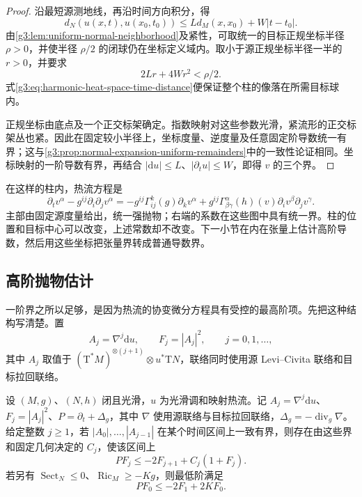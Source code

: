\begin{proof}
	沿最短源测地线，再沿时间方向积分，得
	\begin{equation}\label{g3:eq:harmonic-heat-space-time-distance}
		d_N(u(x,t),u(x_0,t_0))
		\le Ld_M(x,x_0)+W|t-t_0|.
	\end{equation}
	由\cref{g3:lem:uniform-normal-neighborhood}及紧性，可取统一的目标正规坐标半径 \(\rho>0\)，并使半径 \(\rho/2\) 的闭球仍在坐标定义域内。取小于源正规坐标半径一半的 \(r>0\)，并要求
	\[
		2Lr+4Wr^2<\rho/2.
	\]
	式\eqref{g3:eq:harmonic-heat-space-time-distance}便保证整个柱的像落在所需目标球内。

	正规坐标由底点及一个正交标架确定。指数映射对这些参数光滑，紧流形的正交标架丛也紧。因此在固定较小半径上，坐标度量、逆度量及任意固定阶导数统一有界；这与\cref{g3:prop:normal-expansion-uniform-remainders}中的一致性论证相同。坐标映射的一阶导数有界，再结合 \(|\mathrm du|\le L\)、\(|\partial_tu|\le W\)，即得 \(v\) 的三个界。
\end{proof}

在这样的柱内，热流方程是
\[
	\partial_tv^\alpha-g^{ij}\partial_i\partial_jv^\alpha
	=-g^{ij}\Gamma^k_{ij}(g)\partial_kv^\alpha
	+g^{ij}\Gamma^\alpha_{\beta\gamma}(h)(v)
	\partial_iv^\beta\partial_jv^\gamma.
\]
主部由固定源度量给出，统一强抛物；右端的系数在这些图中具有统一界。柱的位置和目标中心可以改变，上述常数却不改变。下一小节在内在张量上估计高阶导数，然后用这些坐标把张量界转成普通导数界。

\subsection{高阶抛物估计}
\label{g3:subsec:2604:03}
一阶界之所以足够，是因为热流的协变微分方程具有受控的最高阶项。先把这种结构写清楚。置
\[
	A_j=\nabla^j\mathrm du,\qquad F_j=|A_j|^2,\qquad j=0,1,\ldots,
\]
其中 \(A_j\) 取值于 \((\mathrm T^*M)^{\otimes(j+1)}\otimes u^*\mathrm TN\)，联络同时使用源 Levi--Civita 联络和目标拉回联络。

\begin{lemma}\label{g3:lem:harmonic-heat-derivative-evolution}
	设 \((M,g)\)、\((N,h)\) 闭且光滑，\(u\) 为光滑调和映射热流。记 \(A_j=\nabla^j\mathrm du\)、\(F_j=|A_j|^2\)、\(P=\partial_t+\Delta_g\)，其中 \(\nabla\) 使用源联络与目标拉回联络，\(\Delta_g=-\operatorname{div}_g\nabla\)。给定整数 \(j\ge1\)，若 \(|A_0|,\ldots,|A_{j-1}|\) 在某个时间区间上一致有界，则存在由这些界和固定几何决定的 \(C_j\)，使该区间上
	\begin{equation}\label{g3:eq:harmonic-heat-higher-evolution}
		PF_j\le-2F_{j+1}+C_j(1+F_j).
	\end{equation}
	若另有 \(\operatorname{Sect}_N\le0\)、\(\operatorname{Ric}_M\ge-Kg\)，则最低阶满足
	\begin{equation}\label{g3:eq:harmonic-heat-base-derivative-evolution}
		PF_0\le-2F_1+2KF_0.
	\end{equation}
\end{lemma}

